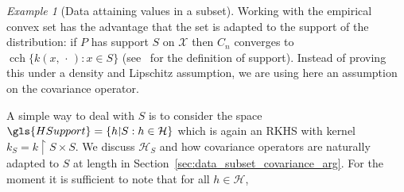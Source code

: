 \documentclass[10pt]{amsart}
\theoremstyle{definition}\newtheorem{defi}[theo]{Definition}\newtheorem{rema}[theo]{Remark}\newtheorem{exam}[theo]{Example}\newtheorem{exem}[theo]{Example}\newtheorem{nota}[theo]{Notation}
\theoremstyle{remark}
\newtheorem{examl}{Example}
\DeclareMathOperator{\cch}{cch}
\newcommand{\restrr}
{\!\!\upharpoonright\!\!}
\newcommand{\X}{\mathcal{X}}
\newcommand{\cH}{\mathcal{H}}
\begin{document}
\begin{examl}[{Data attaining values in a subset}] \label{sec:example_subset}
Working with the empirical convex set has the advantage that the set is adapted to the support of the distribution: if $P$ has support $S$ on $\X$ then $C_n$ converges to $\cch \{k(x,\,\cdot\,) : x \in S \}$ (see~\cite[Definition~411N]{FREM} for the definition of support). Instead of proving this under a density and Lipschitz assumption, we are using here an assumption on the covariance operator.

A simple way to deal with $S$ is to consider the space $\gls{HSupport} = \{ h\restrr S : h \in \cH \}$ which is again an RKHS with kernel $k_S = k\restrr S \times S$. We discuss $\cH_S$ and how covariance operators are naturally adapted to $S$ at length in Section~\ref{sec:data_subset_covariance_arg}. For the moment it is sufficient to note that for all $h\in \cH$,


\end{examl}
\end{document}
